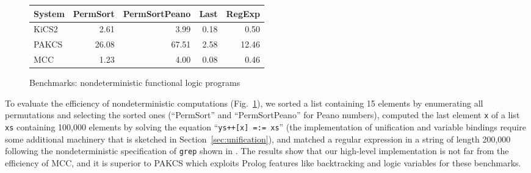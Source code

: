 \documentclass{llncs}
\newcommand{\code}[1]{\mbox{\small\texttt{#1}}}
\newcommand{\ccode}[1]{``\code{#1}''}
\begin{document}
\begin{figure}
\centering
\begin{tabular}{|@{~~}l@{~~}|*{4}{@{~~}r@{~~}|}}
\hline
System  & PermSort & PermSortPeano &  Last & RegExp \\\hline
KiCS2   &     2.61 &         3.99  &  0.18 &   0.50 \\
PAKCS   &    26.08 &        67.51  &  2.58 &  12.46 \\
MCC     &     1.23 &         4.00  &  0.08 &   0.46 \\
\hline
\end{tabular}
\caption{Benchmarks: nondeterministic functional logic programs}
 \label{fig:bench-nondet}
\end{figure}
%
To evaluate the efficiency of nondeterministic computations
(Fig.~\ref{fig:bench-nondet}),
we sorted a list containing 15 elements by enumerating all permutations
and selecting the sorted ones (``PermSort'' and ``PermSortPeano''
for Peano numbers),
computed the last element \code{x}
of a list \code{xs} containing 100,000 elements
by solving the equation \ccode{ys++[x] =:= xs}
(the implementation of unification and variable bindings
require some additional machinery that is sketched in
Section~\ref{sec:unification}),
and matched a regular expression in a string of length 200,000
following the nondeterministic specification of \code{grep} shown
in \cite{AntoyHanus10CACM}.
The results show that our high-level implementation is not far
from the efficiency of MCC,
and it is superior to PAKCS which exploits Prolog features
like backtracking and logic variables for these benchmarks.
\end{document}
